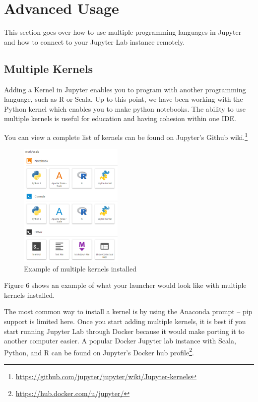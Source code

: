 \documentclass[pdftex,12pt]{artikel3}
\begin{document}
\section{Advanced Usage}

This section goes over how to use multiple programming languages in Jupyter and how to connect to your Jupyter Lab instance remotely.

\subsection{Multiple Kernels}

Adding a Kernel in Jupyter enables you to program with another programming language, such as R or Scala.
Up to this point, we have been working with the Python kernel which enables you to make python notebooks. The ability to use multiple kernels is useful for education and having cohesion within one IDE.

You can view a complete list of kernels can be found on Jupyter's Github wiki.\footnote{\url{https://github.com/jupyter/jupyter/wiki/Jupyter-kernels}}

\begin{figure}[h!]
    \centering
    \includegraphics[width=50mm]{exampleKernels.PNG}
    \caption{Example of multiple kernels installed}
    \label{fig:multKernels}
\end{figure}

Figure 6 shows an example of what your launcher would look like with multiple kernels installed.

The most common way to install a kernel is by using the Anaconda prompt -- pip support is limited here.
Once you start adding multiple kernels, it is best if you start running Jupyter Lab through Docker because it would make porting it to another computer easier. A popular Docker Jupyter lab instance with Scala, Python, and R can be found on Jupyter's Docker hub profile\footnote{\url{https://hub.docker.com/u/jupyter/}}.
\end{document}
